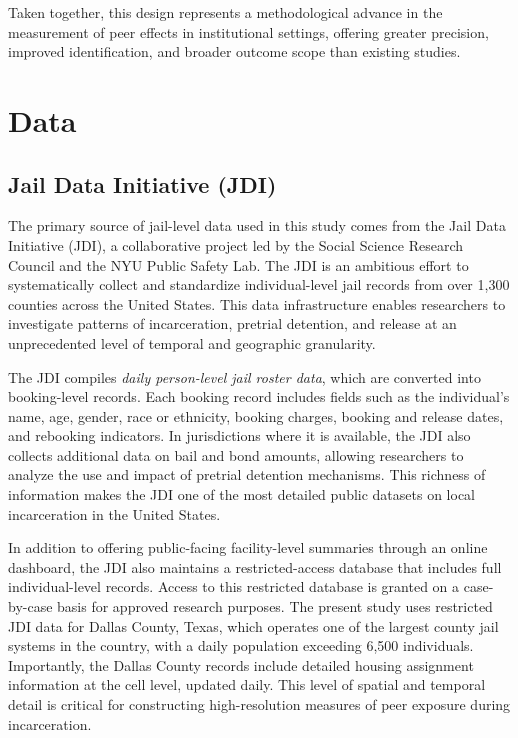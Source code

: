 \documentclass[12pt, a4paper]{article}
\begin{document}
Taken together, this design represents a methodological advance in the measurement of peer effects in institutional settings, offering greater precision, improved identification, and broader outcome scope than existing studies.

\section{Data}

\subsection{Jail Data Initiative (JDI)}

The primary source of jail-level data used in this study comes from the Jail Data Initiative (JDI), a collaborative project led by the Social Science Research Council and the NYU Public Safety Lab. The JDI is an ambitious effort to systematically collect and standardize individual-level jail records from over 1,300 counties across the United States. This data infrastructure enables researchers to investigate patterns of incarceration, pretrial detention, and release at an unprecedented level of temporal and geographic granularity.

The JDI compiles \textit{daily person-level jail roster data}, which are converted into booking-level records. Each booking record includes fields such as the individual's name, age, gender, race or ethnicity, booking charges, booking and release dates, and rebooking indicators. In jurisdictions where it is available, the JDI also collects additional data on bail and bond amounts, allowing researchers to analyze the use and impact of pretrial detention mechanisms. This richness of information makes the JDI one of the most detailed public datasets on local incarceration in the United States.

In addition to offering public-facing facility-level summaries through an online dashboard, the JDI also maintains a restricted-access database that includes full individual-level records. Access to this restricted database is granted on a case-by-case basis for approved research purposes. The present study uses restricted JDI data for Dallas County, Texas, which operates one of the largest county jail systems in the country, with a daily population exceeding 6,500 individuals. Importantly, the Dallas County records include detailed housing assignment information at the cell level, updated daily. This level of spatial and temporal detail is critical for constructing high-resolution measures of peer exposure during incarceration.
\end{document}
